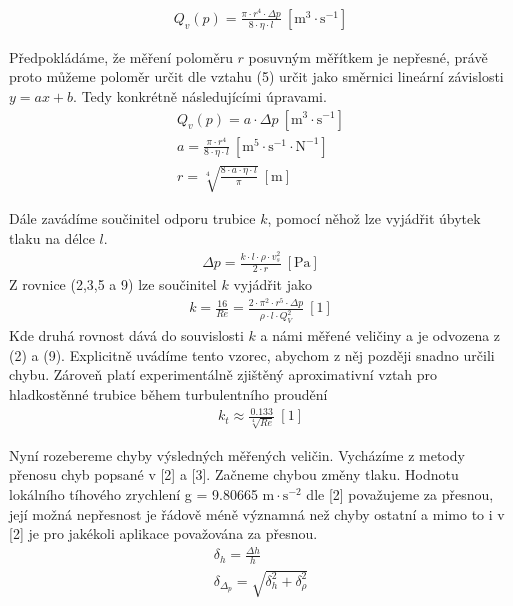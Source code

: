 \documentclass[a4paper]{article}
\begin{document}
\begin{align}
Q_{v}(p) = \frac{\pi \cdot r^{4} \cdot \Delta p}{8 \cdot \eta \cdot l}  \: \mathrm{[m^{3} \cdot s^{-1}]}
\end{align}
\par Předpokládáme, že měření poloměru $r$ posuvným měřítkem je nepřesné, právě proto můžeme poloměr určit dle vztahu (5) určit jako směrnici lineární závislosti $y = ax + b$. Tedy konkrétně následujícími úpravami.
\begin{align}
Q_{v}(p) = a \cdot \Delta p  \: \mathrm{[m^{3} \cdot s^{-1}]} \\
a = \frac{\pi \cdot r^{4}}{8 \cdot \eta \cdot l} \: \mathrm{[m^{5} \cdot s^{-1} \cdot N^{-1} ]} \\
r = \sqrt[4]{\frac{8 \cdot a \cdot \eta \cdot l}{\pi}}  \: \mathrm{[m]}
\end{align}
\par Dále zavádíme součinitel odporu trubice $k$, pomocí něhož lze vyjádřit úbytek tlaku na délce $l$.
\begin{align}
\Delta p = \frac{k \cdot l \cdot \rho \cdot v^{2}_{s}}{2 \cdot r}   \: \mathrm{[Pa]}
\end{align}
Z rovnice (2,3,5 a 9) lze součinitel $k$ vyjádřit jako
\begin{align}
k = \frac{16}{Re} =  \frac{2 \cdot \pi^{2} \cdot r^{5} \cdot \Delta p}{\rho \cdot l \cdot Q^{2}_{V}}  \: \mathrm{[1]}
\end{align}
Kde druhá rovnost dává do souvislosti $k$ a námi měřené veličiny a je odvozena z (2) a (9). Explicitně uvádíme tento vzorec, abychom z něj později snadno určili chybu. Zároveň platí experimentálně zjištěný aproximativní vztah pro hladkostěnné trubice během turbulentního proudění
\begin{align}
k_{t} \approx \frac{0.133}{\sqrt[4]{Re}} \: \mathrm{[1]}
\end{align}
\par Nyní rozebereme chyby výsledných měřených veličin. Vycházíme z metody přenosu chyb popsané v [2] a [3]. Začneme chybou změny tlaku. Hodnotu lokálního tíhového zrychlení g = 9.80665 $\mathrm{m \cdot s^{-2}}$ dle [2] považujeme za přesnou, její možná nepřesnost je řádově méně významná než chyby ostatní a mimo to i v [2] je pro jakékoli aplikace považována za přesnou.
\begin{align}
\delta_{h} = \frac{\Delta h}{h} \\
\delta_{\Delta_p} = \sqrt{\delta^{2}_{h} + \delta^{2}_{\rho}}
\end{align}
\end{document}
